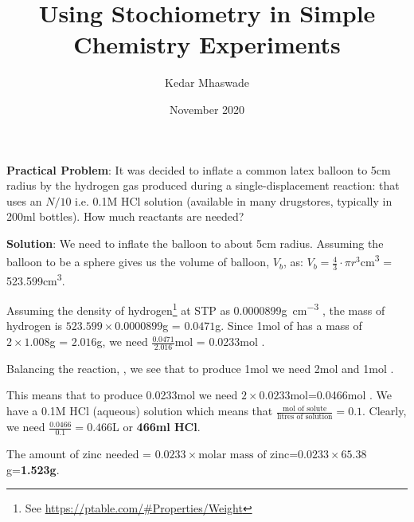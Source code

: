 \documentclass[12pt]{article}
\begin{document}
\title{Using Stochiometry in Simple Chemistry Experiments}
\author{Kedar Mhaswade}
\date{November 2020}
\maketitle
\textbf{Practical Problem}: 
It was decided to inflate a common latex balloon to 5cm radius by the hydrogen gas produced during a single-displacement reaction:  that uses an $N/10$ i.e. 0.1M HCl solution (available in many drugstores, typically in 200ml bottles). How much reactants are needed?

\textbf{Solution}:
We need to inflate the balloon to about 5cm radius. Assuming the balloon to be a sphere gives us the volume of balloon, $V_b$, as:
$ V_b = {\frac{4}{3}\cdot \pi r^3}$\si{\cubic\centi\metre} = 523.599\si{\cubic\centi\metre}.

Assuming the density of hydrogen\footnote{See \url{https://ptable.com/\#Properties/Weight}} at STP as 0.0000899\si{\gram\per\cubic\centi\metre} , the mass of hydrogen is $523.599\times 0.0000899$\si{\g} = $0.0471$\si{\gram}. Since 1\si{\mol} of  has a mass of $2\times 1.008$\si{\gram} = $2.016$\si{\gram}, we need 
$\frac{0.0471}{2.016}$\si{\mol} = 0.0233\si{\mol} .

Balancing the reaction, 
, 
we see that to produce 1\si{\mol}  we need 2\si{\mol}  and 1\si{\mol} .

This means that to produce 0.0233\si{\mol}  we need $2\times0.0233$\si{\mol}=0.0466\si{\mol} . We have a 0.1M HCl (aqueous) solution which means that $\frac{\text{mol of solute}}{\text{litres of solution}} = 0.1$. Clearly, we need $\frac{0.0466}{0.1} = 0.466$\si{L} or \textbf{466\si{ml} HCl}.

The amount of zinc needed = $0.0233\times\text{molar mass of zinc}$=$0.0233\times 65.38$\si{g}=\textbf{1.523\si{g}}.

\let\thefootnote\relax{}
\let\thefootnote\relax{}
\end{document}
